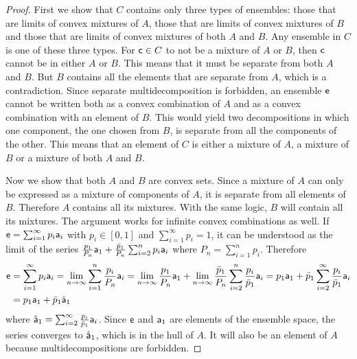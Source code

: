 \begin{mathSection}
\begin{proof}
	First we show that $C$ contains only three types of ensembles: those that are limits of convex mixtures of $A$, those that are limits of convex mixtures of $B$ and those that are limits of convex mixtures of both $A$ and $B$. Any ensemble in $C$ is one of these three types. For $\ens[c] \in C$ to not be a mixture of $A$ or $B$, then $\ens[c]$ cannot be in either $A$ or $B$. This means that it must be separate from both $A$ and $B$. But $B$ contains all the elements that are separate from $A$, which is a contradiction. Since separate multidecomposition is forbidden, an ensemble $\ens$ cannot be written both as a convex combination of $A$ and as a convex combination with an element of $B$. This would yield two decompositions in which one component, the one chosen from $B$, is separate from all the components of the other. This means that an element of $C$ is either a mixture of $A$, a mixture of $B$ or a mixture of both $A$ and $B$.
	
	Now we show that both $A$ and $B$ are convex sets. Since a mixture of $A$ can only be expressed as a mixture of components of $A$, it is separate from all elements of $B$. Therefore $A$ contains all its mixtures. With the same logic, $B$ will contain all its mixtures. The argument works for infinite convex combinations as well. If $\ens = \sum_{i=1}^{\infty} p_i \ens[a]_i$ with $p_i \in [0,1]$ and $\sum_{i=1}^{\infty} p_i = 1$, it can be understood as the limit of the series $\frac{p_1}{P_n} \ens[a]_1 + \frac{\bar{p}_1}{P_n} \sum_{i=2}^{n} p_i \ens[a]_i$ where $P_n = \sum_{i=1}^{n} p_i$. Therefore
	\begin{equation}
		\begin{aligned}
			\ens &= \sum_{i=1}^{\infty} p_i \ens[a]_i = \lim\limits_{n \to \infty}  \sum_{i=1}^{n} \frac{p_i}{P_n} \ens[a]_i = \lim\limits_{n \to \infty} \frac{p_1}{P_n} \ens[a]_1 + \lim\limits_{n \to \infty}\frac{\bar{p}_1}{P_n} \sum_{i=2}^{n} \frac{p_i}{\bar{p}_1} \ens[a]_i = p_1 \ens[a]_1 + \bar{p}_1 \sum_{i=2}^{\infty} \frac{p_i}{\bar{p}_1} \ens[a]_i \\
			&= p_1 \ens[a]_1 + \bar{p}_1 \hat{\ens[a]}_1
		\end{aligned}
	\end{equation}
	where $\hat{\ens[a]}_1 = \sum_{i=2}^{\infty} \frac{p_i}{\bar{p}_1} \ens[a]_i$. Since $\ens$ and $\ens[a]_1$ are elements of the ensemble space, the series converges to $\hat{\ens[a]}_1$, which is in the hull of $A$. It will also be an element of $A$ because multidecompositions are forbidden.
	

\end{proof}
\end{mathSection}
